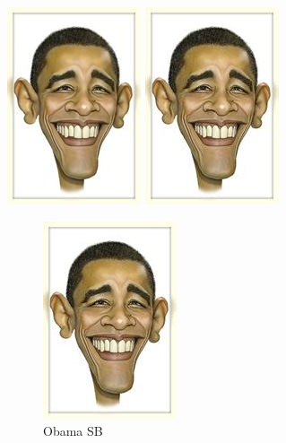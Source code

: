 \documentclass[12pt]{article}
\begin{document}
    \includegraphics[angle=180,origin=c]{obama.jpg}
    \includegraphics[angle=270,origin=c]{obama.jpg} \\

    \graphicspath{{c:/secret -garden/}}
    \graphicspath{{./}}
    \graphicspath{{one-little/}{two-little/}{three-little-indians/}}
    
    \begin{figure}[htbp]
        \centering  %
        \includegraphics{obama.jpg}
        \caption{Obama SB}  %
        \label{fig:myphoto} %
    \end{figure}
    
\end{document}
